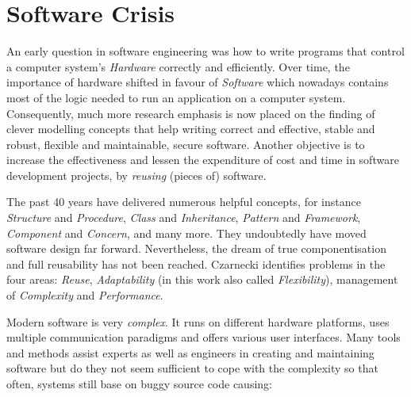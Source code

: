 %
%
%
%
%
%
%

\section{Software Crisis}
\label{software_crisis_heading}

An early question in software engineering was how to write programs that control
a computer system's \emph{Hardware} correctly and efficiently. Over time, the
importance of hardware shifted in favour of \emph{Software} which nowadays
contains most of the logic needed to run an application on a computer system.
Consequently, much more research emphasis is now placed on the finding of clever
modelling concepts that help writing correct and effective, stable and robust,
flexible and maintainable, secure software. Another objective is to increase the
effectiveness and lessen the expenditure of cost and time in software development
projects, by \emph{reusing} (pieces of) software.

The past 40 years have delivered numerous helpful concepts, for instance
\emph{Structure} and \emph{Procedure}, \emph{Class} and \emph{Inheritance},
\emph{Pattern} and \emph{Framework}, \emph{Component} and \emph{Concern}, and
many more. They undoubtedly have moved software design far forward. Nevertheless,
the dream of true componentisation and full reusability has not been reached.
Czarnecki \cite{czarnecki} identifies problems in the four areas: \emph{Reuse},
\emph{Adaptability} (in this work also called \emph{Flexibility}), management
of \emph{Complexity} and \emph{Performance}.

Modern software is very \emph{complex}. It runs on different hardware platforms,
uses multiple communication paradigms and offers various user interfaces. Many
tools and methods assist experts as well as engineers in creating and maintaining
software but do they not seem sufficient to cope with the complexity so that
often, systems still base on buggy source code causing:


